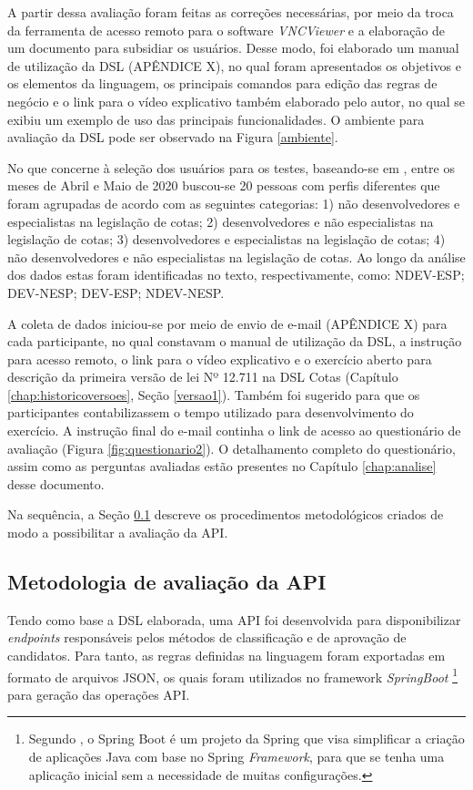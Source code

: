  A partir dessa avaliação foram feitas as correções necessárias, por meio da troca da ferramenta de acesso remoto para o software \textit{VNCViewer} e a elaboração de um documento para subsidiar os usuários. Desse modo, foi elaborado um manual de utilização da DSL (APÊNDICE X), no qual foram apresentados os objetivos e os elementos da linguagem, os principais comandos para edição das regras de negócio e o link para o vídeo explicativo também elaborado pelo autor, no qual se exibiu um exemplo de uso das principais funcionalidades. O ambiente para avaliação da DSL pode ser observado na Figura \ref{ambiente}.
 
 
  
 
 No que concerne à seleção dos usuários para os testes, baseando-se em , entre os meses de Abril e Maio de 2020 buscou-se 20 pessoas com perfis diferentes que foram agrupadas de acordo com as seguintes categorias: 1) não desenvolvedores e especialistas na legislação de cotas; 2) desenvolvedores e não especialistas na legislação de cotas; 3) desenvolvedores e especialistas na legislação de cotas; 4) não desenvolvedores e não especialistas na legislação de cotas. Ao longo da análise dos dados estas foram identificadas no texto, respectivamente, como: NDEV-ESP; DEV-NESP; DEV-ESP; NDEV-NESP. 

 A coleta de dados iniciou-se por meio de envio de e-mail (APÊNDICE X) para cada participante, no qual constavam o manual de utilização da DSL, a instrução para acesso remoto, o link para o vídeo explicativo e o exercício aberto para descrição da primeira versão de lei Nº 12.711 na DSL Cotas (Capítulo \ref{chap:historicoversoes}, Seção \ref{versao1}). Também foi sugerido para que os participantes contabilizassem o tempo utilizado para desenvolvimento do exercício. A instrução final do e-mail continha o link de acesso ao questionário de avaliação (Figura \ref{fig:questionario2}). O detalhamento completo do questionário, assim como as perguntas avaliadas estão presentes no Capítulo \ref{chap:analise} desse documento.

 
 
 \newpage
 Na sequência, a Seção \ref{metodoapi} descreve os procedimentos metodológicos criados de modo a possibilitar a avaliação da \gls{API}.
 

\subsection{Metodologia de avaliação da API}
\label{metodoapi}
Tendo como base a DSL elaborada, uma \gls{API} foi desenvolvida para disponibilizar \textit{endpoints} responsáveis pelos métodos de classificação e de aprovação de candidatos. Para tanto, as regras definidas na linguagem foram exportadas em formato de arquivos JSON, os quais foram utilizados no framework \textit{SpringBoot} \footnote{Segundo , o Spring Boot é um projeto da Spring que visa simplificar a criação de aplicações Java com base no Spring \textit{Framework}, para que se tenha uma aplicação inicial sem a necessidade de muitas configurações.} para geração das operações \gls{API}. 

